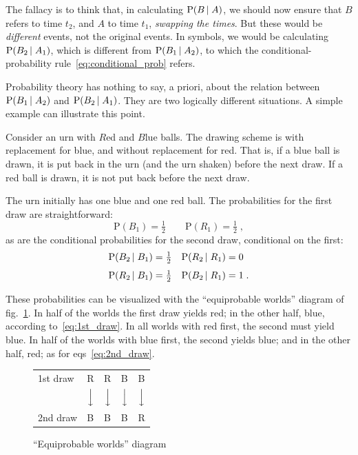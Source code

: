 \documentclass[\ifafour a4paper,12pt,\else a5paper,10pt,\fi%
onecolumn,oneside,article,%
british%
]{memoir}
\theoremstyle{remark}
\theoremstyle{innote}
\newcommand*{\p}{\mathrm{P}}%
\renewcommand*{\|}[1][]{\nonscript\,#1\vert\nonscript\;\mathopen{}}
\newcommand*{\eqns}{eqs}%
\newcommand*{\fig}{fig.}%
\begin{document}
The fallacy is to think that, in calculating $\p(B \| A)$, we should now
ensure that $B$ refers to time $t_{2}$, and $A$ to time $t_{1}$, \emph{swapping
the times}. But these would be \emph{different} events, not the original
events. In symbols, we would be calculating $\p(B_{2} \| A_{1})$, which is
different from $\p(B_{1} \| A_{2})$, to which the conditional-probability
rule~\eqref{eq:conditional_prob} refers.

Probability theory has nothing to say, a priori, about the relation between
$\p(B_{1} \| A_{2})$ and $\p(B_{2} \| A_{1})$. They are two logically
different situations. A simple example can illustrate this point.

Consider an urn with $R$ed and $B$lue balls. The drawing scheme is with
replacement for blue, and without replacement for red. That is, if a blue
ball is drawn, it is put back in the urn (and the urn shaken) before the
next draw. If a red ball is drawn, it is not put back before the next draw.

The urn initially has one blue and one red ball. The probabilities for the
first draw are straightforward:
\begin{equation}
  \label{eq:1st_draw}
  \p(B_{1}) = \tfrac{1}{2} \qquad \p(R_{1}) = \tfrac{1}{2} \;,
\end{equation}
as are the conditional probabilities for the second draw, conditional on
the first:
\begin{subequations}
  \label{eq:2nd_draw}
  \begin{align}
    \p(B_{2} \|B_{1}) &= \tfrac{1}{2}
    & \p(R_{2} \| R_{1}) &= 0
      \label{eq:2nd_draw_equal}
    \\[\jot]
    \p(R_{2} \|B_{1}) &= \tfrac{1}{2}
    & \p(B_{2} \| R_{1}) &= 1 \;.
      \label{eq:2nd_draw_mixed}
  \end{align}
\end{subequations}

These probabilities can be visualized with the \enquote{equiprobable
  worlds} diagram of \fig~\ref{fig:worlds}. In half of the worlds the first
draw yields red; in the other half, blue, according to~\eqref{eq:1st_draw}.
In all worlds with red first, the second must yield blue. In half of the
worlds with blue first, the second yields blue; and in the other half, red;
as for \eqns~\eqref{eq:2nd_draw}.
\begin{figure}[t]
  \begin{framed}
    \centering
    \caption{\enquote{Equiprobable worlds} diagram}\label{fig:worlds}
    \begin{tabular}{p{5em} p{1em} p{1em} p{1em} p{1em} }
      {{\footnotesize 1st draw}}& R& R & B & B
      \\[1ex]
        & $\Big\downarrow$& $\Big\downarrow$
                                   & $\Big\downarrow$& $\Big\downarrow$
      \\[2ex]
      {{\footnotesize 2nd draw}}& B& B & B & R
    \end{tabular}
  \end{framed}
\end{figure}
\end{document}
